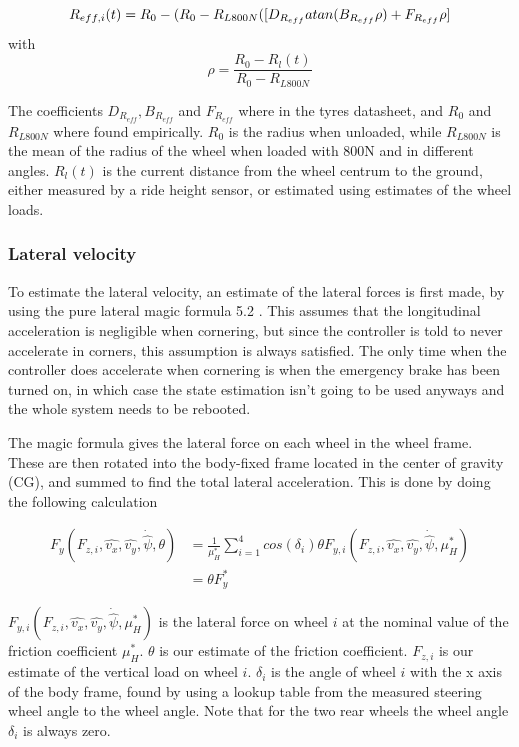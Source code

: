\begin{equation}
    R_{eff,i}(t) = R_0 - (R_0-R_{L800N}([D_{R_{eff}}atan(B_{R_{eff}}\rho) + \\ F_{R_{eff}}\rho]
\end{equation}
with
\begin{equation}
    \rho = \frac{R_0-R_l(t)}{R_0-R_{L800N}}
\end{equation}

The coefficients $D_{R_{eff}}, B_{R_{eff}}$ and $F_{R_{eff}}$ where in the tyres datasheet, and $R_0$ and $R_{L800N}$ where found empirically. $R_0$ is the radius when unloaded, while $R_{L800N}$ is the mean of the radius of the wheel when loaded with 800N and in different angles. $R_l(t)$ is the current distance from the wheel centrum to the ground, either measured by a ride height sensor, or estimated using estimates of the wheel loads.

\subsubsection{Lateral velocity} 
To estimate the lateral velocity, an estimate of the lateral forces is first made, by using the pure lateral magic formula 5.2 \cite{MagicFormula5_2}. This assumes that the longitudinal acceleration is negligible when cornering, but since the controller is told to never accelerate in corners, this assumption is always satisfied. The only time when the controller does accelerate when cornering is when the emergency brake has been turned on, in which case the state estimation isn't going to be used anyways and the whole system needs to be rebooted. 

The magic formula gives the lateral force on each wheel in the wheel frame. These are then rotated into the body-fixed frame located in the center of gravity (CG), and summed to find the total lateral acceleration. This is done by doing the following calculation

\begin{align}
    F_y(F_{z,i},\hat{v_x},\hat{v_y},\dot{\hat{\psi}}, \theta) & = \frac{1}{\mu_{H}^{*}}\sum_{i=1}^{4}cos(\delta_i)\theta F_{y,i}(F_{z,i},\hat{v_x},\hat{v_y},\dot{\hat{\psi}}, \mu_{H}^{*}) \\
    & =  \theta F_y^{*}
\end{align}

$F_{y,i}(F_{z,i},\hat{v_x},\hat{v_y},\dot{\hat{\psi}}, \mu_{H}^{*})$ is the lateral force on wheel $i$ at the nominal value of the friction coefficient $\mu_{H}^{*}$. $\theta$ is our estimate of the friction coefficient. $F_{z,i}$ is our estimate of the vertical load on wheel $i$. $\delta_i$ is the angle of wheel $i$ with the x axis of the body frame, found by using a lookup table from the measured steering wheel angle to the wheel angle. Note that for the two rear wheels the wheel angle $\delta_i$ is always zero. 

